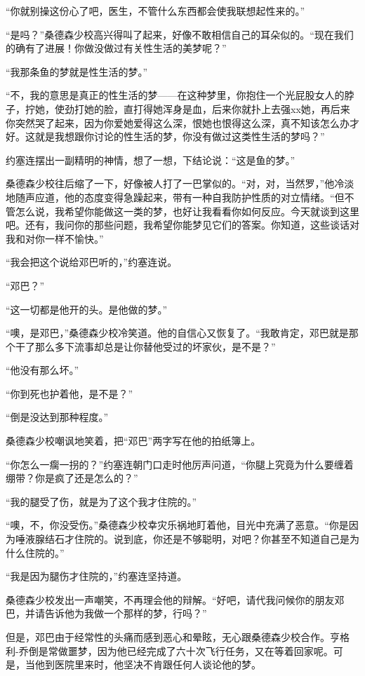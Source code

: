     “你就别操这份心了吧，医生，不管什么东西都会使我联想起性来的。”

    “是吗？”桑德森少校高兴得叫了起来，好像不敢相信自己的耳朵似的。“现在我们的确有了进展！你做没做过有关性生活的美梦呢？”

    “我那条鱼的梦就是性生活的梦。”

    “不，我的意思是真正的性生活的梦——在这种梦里，你抱住一个光屁股女人的脖子，拧她，使劲打她的脸，直打得她浑身是血，后来你就扑上去强xx她，再后来你突然哭了起来，因为你爱她爱得这么深，恨她也恨得这么深，真不知该怎么办才好。这就是我想跟你讨论的性生活的梦，你没有做过这类性生活的梦吗？”

    约塞连摆出一副精明的神情，想了一想，下结论说：“这是鱼的梦。”

    桑德森少校往后缩了一下，好像被人打了一巴掌似的。“对，对，当然罗，”他冷淡地随声应道，他的态度变得急躁起来，带有一种自我防护性质的对立情绪。“但不管怎么说，我希望你能做这一类的梦，也好让我看看你如何反应。今天就谈到这里吧。还有，我问你的那些问题，我希望你能梦见它们的答案。你知道，这些谈话对我和对你一样不愉快。”

    “我会把这个说给邓巴听的，”约塞连说。

    “邓巴？”

    “这一切都是他开的头。是他做的梦。”

    “噢，是邓巴，”桑德森少校冷笑道。他的自信心又恢复了。“我敢肯定，邓巴就是那个干了那么多下流事却总是让你替他受过的坏家伙，是不是？”

    “他没有那么坏。”

    “你到死也护着他，是不是？”

    “倒是没达到那种程度。”

    桑德森少校嘲讽地笑着，把“邓巴”两字写在他的拍纸簿上。

    “你怎么一瘸一拐的？”约塞连朝门口走时他厉声问道，“你腿上究竟为什么要缠着绷带？你是疯了还是怎么的？”

    “我的腿受了伤，就是为了这个我才住院的。”

    “噢，不，你没受伤。”桑德森少校幸灾乐祸地盯着他，目光中充满了恶意。“你是因为唾液腺结石才住院的。说到底，你还是不够聪明，对吧？你甚至不知道自己是为什么住院的。”

    “我是因为腿伤才住院的，”约塞连坚持道。

    桑德森少校发出一声嘲笑，不再理会他的辩解。“好吧，请代我问候你的朋友邓巴，并请告诉他为我做一个那样的梦，行吗？”

    但是，邓巴由于经常性的头痛而感到恶心和晕眩，无心跟桑德森少校合作。亨格利-乔倒是常做噩梦，因为他已经完成了六十次飞行任务，又在等着回家呢。可是，当他到医院里来时，他坚决不肯跟任何人谈论他的梦。
 


